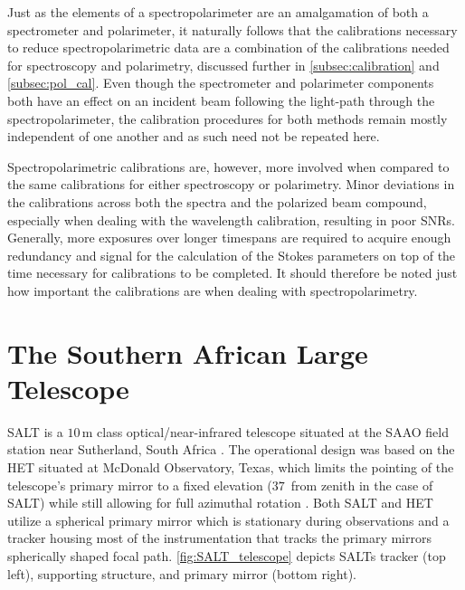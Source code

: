 Just as the elements of a spectropolarimeter are an amalgamation of both a spectrometer and polarimeter, it naturally follows that the calibrations necessary to reduce spectropolarimetric data are a combination of the calibrations needed for spectroscopy and polarimetry, discussed further in \autoref{subsec:calibration} and \autoref{subsec:pol_cal}.
Even though the spectrometer and polarimeter components both have an effect on an incident beam following the light-path through the spectropolarimeter, the calibration procedures for both methods remain mostly independent of one another and as such need not be repeated here.

Spectropolarimetric calibrations are, however, more involved when compared to the same calibrations for either spectroscopy or polarimetry.
Minor deviations in the calibrations across both the spectra and the polarized beam compound, especially when dealing with the wavelength calibration, resulting in poor \glspl{SNR}.
Generally, more exposures over longer timespans are required to acquire enough redundancy and signal for the calculation of the Stokes parameters on top of the time necessary for calibrations to be completed.
It should therefore be noted just how important the calibrations are when dealing with spectropolarimetry.

\section{The Southern African Large Telescope} \label{sec:SALT} %

\gls{SALT} is a $10$\,m class optical/near-infrared telescope situated at the \gls{SAAO} field station near Sutherland, South Africa \citep{SALT_optical_design}.
The operational design was based on the \gls{HET} situated at McDonald Observatory, Texas, which limits the pointing of the telescope's primary mirror to a fixed elevation ($37$\degree\ from zenith in the case of \gls{SALT}) while still allowing for full azimuthal rotation \citep{HET}.
Both \gls{SALT} and \gls{HET} utilize a spherical primary mirror which is stationary during observations and a tracker housing most of the instrumentation that tracks the primary mirrors spherically shaped focal path.
\autoref{fig:SALT_telescope} depicts \glspl{SALT} tracker (top left), supporting structure, and primary mirror (bottom right).

